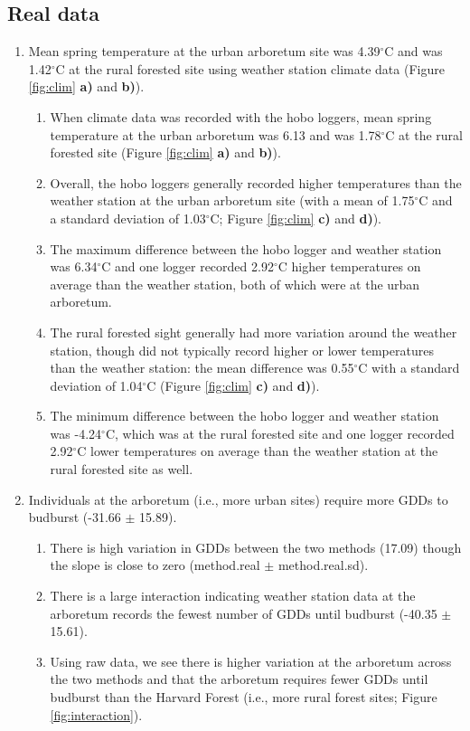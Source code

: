 \documentclass{article}\usepackage[]{graphicx}\usepackage[]{color}
\begin{document}
\subsection*{Real data}
\begin{enumerate}
\item Mean spring temperature at the urban arboretum site was 4.39$^{\circ}$C and was 1.42$^{\circ}$C at the rural forested site using weather station climate data (Figure \ref{fig:clim} \textbf{a)} and \textbf{b)}). 
  \begin{enumerate}
  \item When climate data was recorded with the hobo loggers, mean spring temperature at the urban arboretum was 6.13 and was 1.78$^{\circ}$C at the rural forested site (Figure \ref{fig:clim} \textbf{a)} and \textbf{b)}). 
  \item Overall, the hobo loggers generally recorded higher temperatures than the weather station at the urban arboretum site (with a mean of 1.75$^{\circ}$C and a standard deviation of 1.03$^{\circ}$C; Figure \ref{fig:clim} \textbf{c)} and \textbf{d)}).
  \item The maximum difference between the hobo logger and weather station was 6.34$^{\circ}$C and one logger recorded 2.92$^{\circ}$C higher temperatures on average than the weather station, both of which were at the urban arboretum. 
  \item The rural forested sight generally had more variation around the weather station, though did not typically record higher or lower temperatures than the weather station: the mean difference was 0.55$^{\circ}$C with a standard deviation of 1.04$^{\circ}$C (Figure \ref{fig:clim} \textbf{c)} and \textbf{d)}).
  \item The minimum difference between the hobo logger and weather station was -4.24$^{\circ}$C, which was at the rural forested site and one logger recorded 2.92$^{\circ}$C lower temperatures on average than the weather station at the rural forested site as well. 
  \end{enumerate}

\item Individuals at the arboretum (i.e., more urban sites) require more GDDs to budburst (-31.66 $\pm$ 15.89).
  \begin{enumerate}
  \item There is high variation in GDDs between the two methods (17.09) though the slope is close to zero (method.real $\pm$ method.real.sd).
  \item There is a large interaction indicating weather station data at the arboretum records the fewest number of GDDs until budburst (-40.35 $\pm$ 15.61). 
  \item Using raw data, we see there is higher variation at the arboretum across the two methods and that the arboretum requires fewer GDDs until budburst than the Harvard Forest (i.e., more rural forest sites; Figure \ref{fig:interaction}).
  \end{enumerate}


\end{enumerate}
\end{document}
